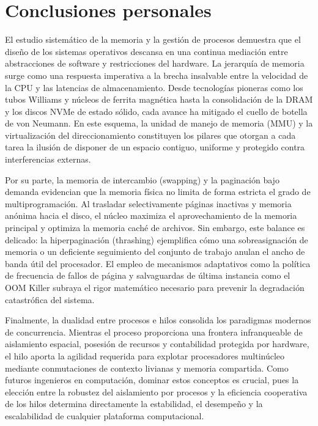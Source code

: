 \documentclass[12pt]{article}
\begin{document}
\clearpage

\section{Conclusiones personales}

El estudio sistemático de la memoria y la gestión de procesos demuestra que el diseño de los sistemas operativos descansa en una continua mediación entre abstracciones de software y restricciones del hardware. La jerarquía de memoria surge como una respuesta imperativa a la brecha insalvable entre la velocidad de la CPU y las latencias de almacenamiento. Desde tecnologías pioneras como los tubos Williams y núcleos de ferrita magnética hasta la consolidación de la DRAM y los discos NVMe de estado sólido, cada avance ha mitigado el cuello de botella de von Neumann. En este esquema, la unidad de manejo de memoria (MMU) y la virtualización del direccionamiento constituyen los pilares que otorgan a cada tarea la ilusión de disponer de un espacio contiguo, uniforme y protegido contra interferencias externas.

Por su parte, la memoria de intercambio (swapping) y la paginación bajo demanda evidencian que la memoria física no limita de forma estricta el grado de multiprogramación. Al trasladar selectivamente páginas inactivas y memoria anónima hacia el disco, el núcleo maximiza el aprovechamiento de la memoria principal y optimiza la memoria caché de archivos. Sin embargo, este balance es delicado: la hiperpaginación (thrashing) ejemplifica cómo una sobreasignación de memoria o un deficiente seguimiento del conjunto de trabajo anulan el ancho de banda útil del procesador. El empleo de mecanismos adaptativos como la política de frecuencia de fallos de página y salvaguardas de última instancia como el OOM Killer subraya el rigor matemático necesario para prevenir la degradación catastrófica del sistema.

Finalmente, la dualidad entre procesos e hilos consolida los paradigmas modernos de concurrencia. Mientras el proceso proporciona una frontera infranqueable de aislamiento espacial, posesión de recursos y contabilidad protegida por hardware, el hilo aporta la agilidad requerida para explotar procesadores multinúcleo mediante conmutaciones de contexto livianas y memoria compartida. Como futuros ingenieros en computación, dominar estos conceptos es crucial, pues la elección entre la robustez del aislamiento por procesos y la eficiencia cooperativa de los hilos determina directamente la estabilidad, el desempeño y la escalabilidad de cualquier plataforma computacional.

\nocite{*}
\printbibliography[heading=bibintoc, title={Referencias}]
\end{document}
